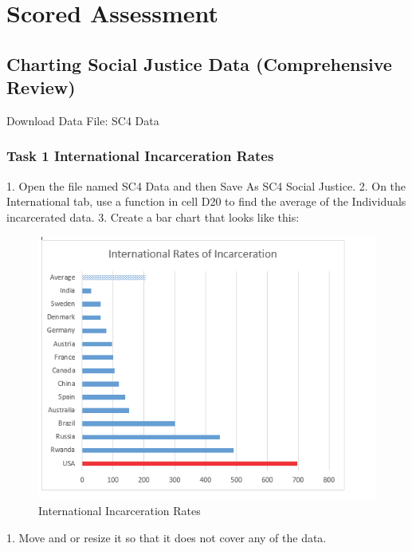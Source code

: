 \section{Scored Assessment}




\subsection{Charting Social Justice Data (Comprehensive Review)}

Download Data File: SC4 Data

\subsubsection{Task 1 International Incarceration Rates}

1. Open the file named SC4 Data and then Save As SC4 Social Justice.
2. On the International tab, use a function in cell D20 to find the average of the Individuals
incarcerated data.
3. Create a bar chart that looks like this:



\begin{figure}[H]
	\centering
	\includegraphics[width=\maxwidth{.95\linewidth}]{gfx/ch04_fig53}
	\caption{International Incarceration Rates}
	\label{04:fig53}
\end{figure}



1. Move and or resize it so that it does not cover any of the data.



